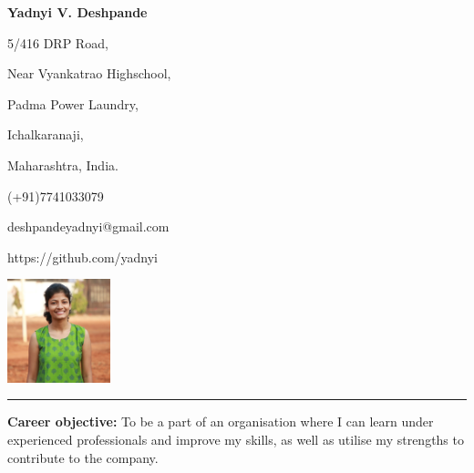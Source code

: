\documentclass[a4paper,11pt]{article}
\begin{document}
	\begin{flushleft}
	 	\begin{Huge}
			\textbf{Yadnyi V. Deshpande}
		\end{Huge}
	\end{flushleft}

		\begin{minipage}[b]{0.4\textwidth}
			\raggedright
			5/416 DRP Road,\par
			Near Vyankatrao Highschool,\par
			Padma Power Laundry, \par
			Ichalkaranaji,\par
			Maharashtra, India.
		\end{minipage}%
		\begin{minipage}[b]{0.3\textwidth}
			\raggedright
			\begin{large}
				(+91)7741033079\par
				\centering
				\raggedright
				deshpandeyadnyi@gmail.com\par
				\centering  
				\raggedright
				https://github.com/yadnyi\par
			\end{large}
		\end{minipage}%
		\begin{minipage}[b]{0.3\textwidth}
			\centering
			\includegraphics[width = 30mm, height = 30mm]{yadnyi.JPG}
		\end{minipage}%
		
\noindent\rule{18.59cm}{0.4pt}	

\begin{minipage}[t]{1\textwidth}
			\raggedright\smallskip
			\begin{Large}
				\textbf{Career objective:}\medskip\linebreak%
				{\small To be a part of an organisation where I can learn under experienced professionals and improve my skills, as well as utilise my strengths to contribute to the company.}\linebreak%
			\end{Large}
		\end{minipage}%
		\vspace{0.35cm}
\end{document}
